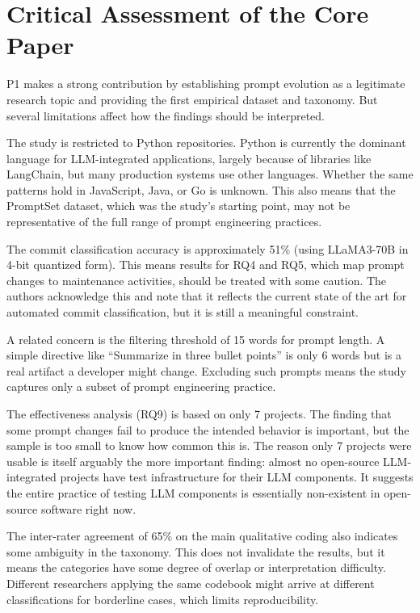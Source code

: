 \documentclass[
    pdftex,
    final,
    11pt,
    a4paper,
    parskip=false,
    oneside,
    footheight=0mm,
    footinclude=false,
    toc=bibliography
]{scrbook}
\begin{document}
\section{Critical Assessment of the Core Paper}

P1 makes a strong contribution by establishing prompt evolution as a legitimate research topic and providing the first empirical dataset and taxonomy. But several limitations affect how the findings should be interpreted.

The study is restricted to Python repositories. Python is currently the dominant language for LLM-integrated applications, largely because of libraries like LangChain, but many production systems use other languages. Whether the same patterns hold in JavaScript, Java, or Go is unknown. This also means that the PromptSet dataset, which was the study's starting point, may not be representative of the full range of prompt engineering practices.

The commit classification accuracy is approximately 51\% (using LLaMA3-70B in 4-bit quantized form). This means results for RQ4 and RQ5, which map prompt changes to maintenance activities, should be treated with some caution. The authors acknowledge this and note that it reflects the current state of the art for automated commit classification, but it is still a meaningful constraint.

A related concern is the filtering threshold of 15 words for prompt length. A simple directive like ``Summarize in three bullet points'' is only 6 words but is a real artifact a developer might change. Excluding such prompts means the study captures only a subset of prompt engineering practice.

The effectiveness analysis (RQ9) is based on only 7 projects. The finding that some prompt changes fail to produce the intended behavior is important, but the sample is too small to know how common this is. The reason only 7 projects were usable is itself arguably the more important finding: almost no open-source LLM-integrated projects have test infrastructure for their LLM components. It suggests the entire practice of testing LLM components is essentially non-existent in open-source software right now.

The inter-rater agreement of 65\% on the main qualitative coding also indicates some ambiguity in the taxonomy. This does not invalidate the results, but it means the categories have some degree of overlap or interpretation difficulty. Different researchers applying the same codebook might arrive at different classifications for borderline cases, which limits reproducibility.
\end{document}
